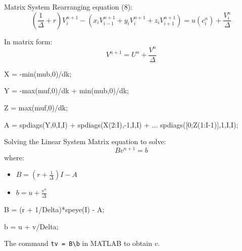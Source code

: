 \documentclass[]{beamer}
\newenvironment{code}{\begin{semiverbatim}\footnotesize}{\end{semiverbatim}}
\begin{document}
\begin{frame}{Matrix System}
    Rearranging equation (8):
    \begin{equation}
        (\frac{1}{\Delta} + r)V_i^{n+1} - (x_i V_{i-1}^{n+1} + y_i V_i^{n+1} + z_i V_{i+1}^{n+1}) = u(c_i^n) + \frac{V_i^n}{\Delta} \tag{10}
    \end{equation}
    
    In matrix form:
    \begin{equation}
        [(\frac{1}{\Delta} + r)I - A^n]V^{n+1} = U^n + \frac{V^n}{\Delta} \tag{11}
    \end{equation}

    
    \begin{code}
    X = -min(mub,0)/dk;
    
    Y = -max(muf,0)/dk + min(mub,0)/dk;
    
    Z = max(muf,0)/dk;
    
    A = spdiags(Y,0,I,I) + spdiags(X(2:I),-1,I,I) + ...
        spdiags([0;Z(1:I-1)],1,I,I);
        
    \end{code}
\end{frame}

\begin{frame}{Solving the Linear System}
    Matrix equation to solve:
    \begin{equation}
        Bv^{n+1} = b \tag{16}
    \end{equation}
    where:
    \begin{itemize}
        \item $B = (r + \frac{1}{\Delta})I - A$
        \item $b = u + \frac{v^n}{\Delta}$
    \end{itemize}

    \begin{code}
    B = (r + 1/Delta)*speye(I) - A;
    
    b = u + v/Delta;
    
    \end{code}
    The command \texttt{tv = B\textbackslash{}b} in MATLAB to obtain $v$.
    \end{frame}
\end{document}
